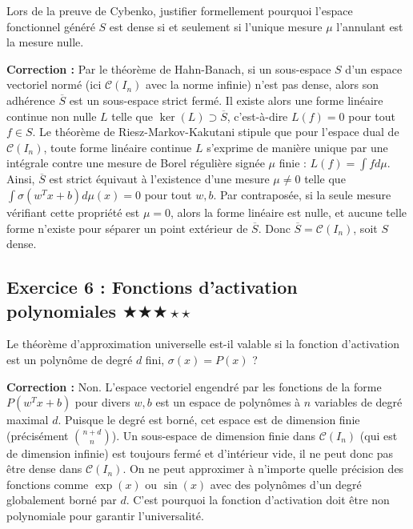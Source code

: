 \documentclass[11pt,a4paper]{article}
\begin{document}
Lors de la preuve de Cybenko, justifier formellement pourquoi l'espace fonctionnel généré $S$ est dense si et seulement si l'unique mesure $\mu$ l'annulant est la mesure nulle.

\textbf{Correction :}
Par le théorème de Hahn-Banach, si un sous-espace $S$ d'un espace vectoriel normé (ici $\mathcal{C}(I_n)$ avec la norme infinie) n'est pas dense, alors son adhérence $\overline{S}$ est un sous-espace strict fermé.
Il existe alors une forme linéaire continue non nulle $L$ telle que $\ker(L) \supset \overline{S}$, c'est-à-dire $L(f) = 0$ pour tout $f \in S$.
Le théorème de Riesz-Markov-Kakutani stipule que pour l'espace dual de $\mathcal{C}(I_n)$, toute forme linéaire continue $L$ s'exprime de manière unique par une intégrale contre une mesure de Borel régulière signée $\mu$ finie : $L(f) = \int f d\mu$.
Ainsi, $\overline{S}$ est strict équivaut à l'existence d'une mesure $\mu \neq 0$ telle que $\int \sigma(w^T x + b) d\mu(x) = 0$ pour tout $w, b$.
Par contraposée, si la seule mesure vérifiant cette propriété est $\mu = 0$, alors la forme linéaire est nulle, et aucune telle forme n'existe pour séparer un point extérieur de $\overline{S}$. Donc $\overline{S} = \mathcal{C}(I_n)$, soit $S$ dense.


\vspace{1cm}
\subsection*{Exercice 6 : Fonctions d'activation polynomiales \quad $\bigstar\bigstar\bigstar\star\star$}

Le théorème d'approximation universelle est-il valable si la fonction d'activation est un polynôme de degré $d$ fini, $\sigma(x) = P(x)$ ?

\textbf{Correction :}
Non. L'espace vectoriel engendré par les fonctions de la forme $P(w^T x + b)$ pour divers $w, b$ est un espace de polynômes à $n$ variables de degré maximal $d$.
Puisque le degré est borné, cet espace est de dimension finie (précisément $\binom{n+d}{n}$).
Un sous-espace de dimension finie dans $\mathcal{C}(I_n)$ (qui est de dimension infinie) est toujours fermé et d'intérieur vide, il ne peut donc pas être dense dans $\mathcal{C}(I_n)$.
On ne peut approximer à n'importe quelle précision des fonctions comme $\exp(x)$ ou $\sin(x)$ avec des polynômes d'un degré globalement borné par $d$. C'est pourquoi la fonction d'activation doit être non polynomiale pour garantir l'universalité.


\vspace{1cm}
\end{document}
